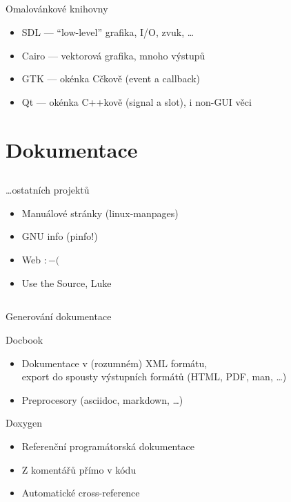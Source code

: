 \documentclass{beamer}
\begin{document}
\subsection{}
\begin{frame}{Omalovánkové knihovny}
\begin{itemize}
\item SDL --- ``low-level'' grafika, I/O, zvuk, \dots
\item Cairo --- vektorová grafika, mnoho výstupů
\item GTK --- okénka Cčkově (event a callback)
\item Qt --- okénka C++kově (signal a slot), i non-GUI věci
\end{itemize}
\end{frame}


\section{Dokumentace}

\subsection{}
\begin{frame}{\dots ostatních projektů}
\begin{itemize}
\item Manuálové stránky (linux-manpages)
\item GNU info (pinfo!)
\item Web $:-($
\item Use the Source, Luke
\end{itemize}
\end{frame}

\subsection{}
\begin{frame}{Generování dokumentace}
\begin{center}
\begin{block}{Docbook}
\begin{itemize}
\item Dokumentace v (rozumném) XML formátu, \\ export do spousty výstupních formátů (HTML, PDF, man, \dots)
\item Preprocesory (asciidoc, markdown, \dots)
\end{itemize}
\end{block}
\begin{block}{Doxygen}
\begin{itemize}
\item Referenční programátorská dokumentace
\item Z komentářů přímo v kódu
\item Automatické cross-reference
\end{itemize}
\end{block}
\end{center}
\end{frame}
\end{document}
